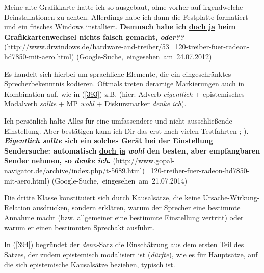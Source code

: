 \begin{exe}
	\ex\label{392}
	\scriptsize
	Meine alte Grafikkarte hatte ich so ausgebaut, ohne vorher auf irgendwelche Deinstallationen zu achten. Allerdings habe ich dann die Festplatte 			formatiert und ein frisches Windows installiert. \textbf{Demnach habe ich \underline{doch ja} beim Grafikkartenwechsel nichts falsch gemacht, 				\textit{oder??}}
	\newline
	\hbox{}\hfill\hbox{(http://www.drwindows.de/hardware-and-treiber/53 }	
	\newline
	\hbox{}\hfill\hbox{120-treiber-fuer-radeon-hd7850-mit-aero.html)}	
	\newline
	\hbox{}\hfill\hbox{(Google-Suche, eingesehen am 24.07.2012)}
	\newline
	\hbox{}\hfill\hbox{\citet[201]{Mueller2014a}}
\end{exe}		     
Es handelt sich hierbei um sprachliche Elemente, die ein eingeschränktes Sprecherbekenntnis kodieren. Oftmals treten derartige Markierungen auch in Kombination auf, wie in (\ref{393}) z.B. (hier: Adverb \textit{eigentlich} + epistemisches Modalverb \textit{sollte} + MP \textit{wohl} +  Diskursmarker \textit{denke ich}).
\begin{exe}
	\ex\label{393}
	\scriptsize
	Ich persönlich halte \glqq Alles für eine umfassendere und nicht ausschließende Einstellung. Aber bestätigen kann ich Dir das erst nach vielen Testfahrten ;-). \textbf{\textit{Eigentlich sollte} sich ein solches Gerät bei der Einstellung \glqq Sendersuche: automatisch\grqq{} \underline{doch ja} \textit{wohl} den besten, aber empfangbaren Sender nehmen, so \textit{denke ich}.}
	\hfill\hbox{(http://www.gopal-navigator.de/archive/index.php/t-5689.html)                                                                      }
	\newline
	\hbox{}\hfill\hbox{120-treiber-fuer-radeon-hd7850-mit-aero.html)}	
	\newline
	\hbox{}\hfill\hbox{(Google-Suche, eingesehen am 21.07.2014)}
	\newline
	\hbox{}\hfill\hbox{\citet[208]{Mueller2017b}}
\end{exe}
Die dritte Klasse konstituiert sich durch Kausalsätze, die keine Ursache-Wirkung-Relation ausdrücken, sondern erklären, warum der Sprecher eine bestimmte Annahme macht (bzw. allgemeiner eine bestimmte Einstellung vertritt) oder warum er einen bestimmten Sprechakt ausführt. 

In (\ref{394}) begründet der \textit{denn}-Satz die Einschätzung aus dem ersten Teil des Satzes, der zudem epistemisch modalisiert ist (\textit{dürfte}), wie es für Hauptsätze, auf die sich epistemische Kausalsätze beziehen, typisch ist. 
        
